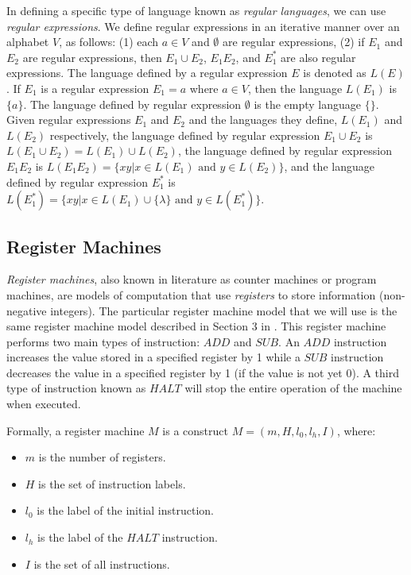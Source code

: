 \documentclass[smallextended]{svjour3}
\begin{document}
In defining a specific type of language known as \textit{regular languages}, we can use
\textit{regular expressions}. We define regular expressions in an iterative manner over an alphabet
$V$, as follows: (1) each $a \in V$ and $\emptyset$ are regular expressions, (2) if $E_1$ and $E_2$ are regular expressions, then $E_1 \cup E_2$,
$E_1 E_2$, and $E_1^*$ are also regular expressions. The language defined by a regular expression $E$ is denoted as $L(E)$. If $E_1$ is a regular
expression $E_1 = a$ where  $a \in V$, then the language $L(E_1)$ is $\{a\}$. The language defined by regular expression $\emptyset$ is the empty
language $\{\}$. Given regular expressions $E_1$ and $E_2$ and the languages they define, $L(E_1)$ and $L(E_2)$ respectively, the language
defined by regular expression $E_1 \cup E_2$ is  $L(E_1 \cup E_2) =L(E_1) \cup L(E_2)$, the language defined by regular expression $E_1 E_2$
is $L(E_1 E_2) = \{xy|x \in L(E_1) \text{ and } y \in L(E_2) \}$, and the language defined by regular expression $E_1^*$ is $L(E_1^*) = \{xy|
x \in L(E_1) \cup \{\lambda\} \text{ and } y \in L(E_1^*)\}$. 


\subsection{Register Machines}\label{sec-register}

\textit{Register machines}, also known in literature as counter machines or program machines, are models of computation that use \textit{registers} to
store information (non-negative integers). The particular register machine model that we will use is the same register machine model described in 
Section 3 in \cite{SNP}. This register machine performs two main types of instruction: $ADD$ and $SUB$. An $ADD$ instruction increases the value 
stored in a specified register by 1 while a $SUB$ instruction decreases the value in a specified register by 1 (if the value is not yet 0). A third 
type of  instruction known as $HALT$ will stop the entire operation of the machine when executed.
    
Formally, a register machine $M$ is a construct $M = (m, H, l_0, l_h, I)$, where:
  
\begin{itemize}  
   \item $m$ is the number of registers.    
   \item $H$ is the set of instruction labels.    
   \item $l_0$ is the label of the initial instruction.
   \item $l_h$ is the label of the $HALT$ instruction.
   \item $I$ is the set of all instructions.    
\end{itemize}
\end{document}
